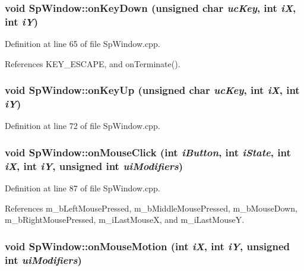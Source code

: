 \subsubsection{\setlength{\rightskip}{0pt plus 5cm}void Sp\-Window::on\-Key\-Down (unsigned char {\em uc\-Key}, int {\em i\-X}, int {\em i\-Y})\hspace{0.3cm}{\tt  [virtual]}}\label{classSpark_1_1SpWindow_a8}


Definition at line 65 of file Sp\-Window.cpp.

References KEY\_\-ESCAPE, and on\-Terminate().
\subsubsection{\setlength{\rightskip}{0pt plus 5cm}void Sp\-Window::on\-Key\-Up (unsigned char {\em uc\-Key}, int {\em i\-X}, int {\em i\-Y})\hspace{0.3cm}{\tt  [virtual]}}\label{classSpark_1_1SpWindow_a9}


Definition at line 72 of file Sp\-Window.cpp.
\subsubsection{\setlength{\rightskip}{0pt plus 5cm}void Sp\-Window::on\-Mouse\-Click (int {\em i\-Button}, int {\em i\-State}, int {\em i\-X}, int {\em i\-Y}, unsigned int {\em ui\-Modifiers})\hspace{0.3cm}{\tt  [virtual]}}\label{classSpark_1_1SpWindow_a14}


Definition at line 87 of file Sp\-Window.cpp.

References m\_\-b\-Left\-Mouse\-Pressed, m\_\-b\-Middle\-Mouse\-Pressed, m\_\-b\-Mouse\-Down, m\_\-b\-Right\-Mouse\-Pressed, m\_\-i\-Last\-Mouse\-X, and m\_\-i\-Last\-Mouse\-Y.
\subsubsection{\setlength{\rightskip}{0pt plus 5cm}void Sp\-Window::on\-Mouse\-Motion (int {\em i\-X}, int {\em i\-Y}, unsigned int {\em ui\-Modifiers})\hspace{0.3cm}{\tt  [virtual]}}\label{classSpark_1_1SpWindow_a13}


